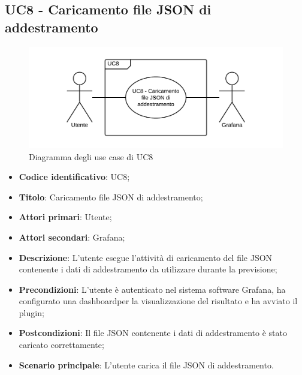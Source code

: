 \subsection{UC8 - Caricamento file JSON di addestramento}
\begin{figure}[H]
\includegraphics{img/UC8_-_Caricamento_file_JSON_di_addestramento.png}
\caption{Diagramma degli use case di UC8}
\end{figure}
\begin{itemize}
	\item \textbf{Codice identificativo}: UC8;
	\item \textbf{Titolo}: Caricamento file JSON di addestramento;
	\item \textbf{Attori primari}: Utente;
	\item \textbf{Attori secondari}: Grafana\glo;
	\item \textbf{Descrizione}: L'utente esegue l'attività di caricamento del file JSON contenente i dati di addestramento da utilizzare durante la previsione;
	\item \textbf{Precondizioni}: L'utente è autenticato nel sistema software Grafana\glosp, ha configurato una dashboard\glosp per la visualizzazione del risultato e ha avviato il plugin;
	\item \textbf{Postcondizioni}: Il file JSON contenente i dati di addestramento è stato caricato correttamente;
	\item \textbf{Scenario principale}: L'utente carica il file JSON di addestramento.
\end{itemize}